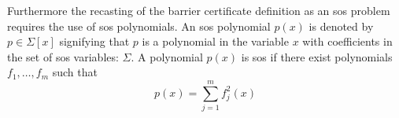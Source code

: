 \vspace{-1mm}
Furthermore the recasting of the barrier certificate definition as an \gls{sos} problem requires the use of \gls{sos} polynomials. An \gls{sos} polynomial $p(x)$ is denoted by $p\in\Sigma[x]$ signifying that $p$ is a polynomial in the variable $x$ with coefficients in the set of \gls{sos} variables: $\Sigma$. A polynomial $p(x)$ is \gls{sos} if there exist polynomials $f_1,\dots,f_m$ such that \citep{bib:parrilo_sdp}
\vspace{-2mm}
\begin{equation}
p(x) = \sum_{j=1}^{m}f_j^2(x)
\end{equation}
%

